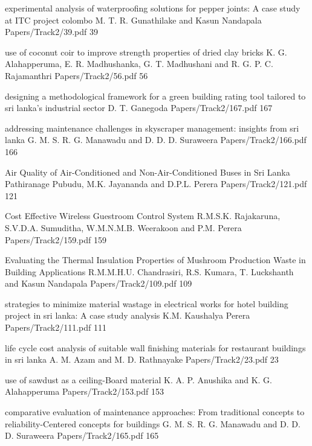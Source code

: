     \addpaper
{experimental analysis of waterproofing solutions
for pepper joints: A case study at ITC project
colombo}
  {M. T. R. Gunathilake and Kasun Nandapala} 
 {Papers/Track2/39.pdf}
 {39} 


\addpaper
{use of coconut coir to improve strength
properties of dried clay bricks}
{K. G. Alahapperuma, E. R. Madhushanka, G. T. Madhushani and R. G. P. C. Rajamanthri}
{Papers/Track2/56.pdf}
{56}

\addpaper
{designing a methodological framework for a green building rating tool tailored to sri lanka’s industrial sector}
{D. T. Ganegoda}
{Papers/Track2/167.pdf}
{167}

\addpaper
{addressing maintenance challenges in skyscraper
management: insights from sri lanka}
{G. M. S. R. G. Manawadu and D. D. D. Suraweera}
{Papers/Track2/166.pdf}
{166}


\addpaper
{Air Quality of Air-Conditioned and Non-Air-Conditioned Buses in Sri Lanka}
{Pathiranage Pubudu, M.K. Jayananda and D.P.L. Perera}
{Papers/Track2/121.pdf}
{121}



    \addpaper
{Cost Effective Wireless Guestroom Control System}
 {R.M.S.K. Rajakaruna, S.V.D.A. Sumuditha, W.M.N.M.B. Weerakoon and P.M.
Perera} 
 {Papers/Track2/159.pdf}
   {159} 

    \addpaper
{Evaluating the Thermal Insulation Properties of Mushroom Production Waste in Building Applications}
 {R.M.M.H.U. Chandrasiri, R.S. Kumara, T. Luckshanth and Kasun Nandapala} 
 {Papers/Track2/109.pdf}
   {109} 




    \addpaper
{strategies to minimize material wastage in
electrical works for hotel building project in sri
lanka: A case study analysis}
 {K.M. Kaushalya Perera } 
 {Papers/Track2/111.pdf}
   {111} 


\addpaper
{life cycle cost analysis of suitable wall finishing materials for restaurant buildings in sri lanka}
{A. M. Azam and M. D. Rathnayake}
{Papers/Track2/23.pdf}
{23}


\addpaper
{use of sawdust as a ceiling-Board material}
{K. A. P. Anushika and K. G. Alahapperuma}
{Papers/Track2/153.pdf}
{153}

\addpaper
{comparative evaluation of maintenance
approaches: From traditional concepts to
reliability-Centered concepts for buildings}
{G. M. S. R. G. Manawadu and D. D. D. Suraweera}
{Papers/Track2/165.pdf}
{165}




